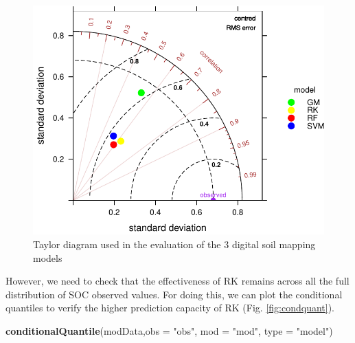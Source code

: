 \documentclass[10pt,b5paper,]{book}
\newenvironment{Shaded}{\begin{snugshade}}{\end{snugshade}}
\newcommand{\DataTypeTok}[1]{\textcolor[rgb]{0.13,0.29,0.53}{#1}}
\newcommand{\KeywordTok}[1]{\textcolor[rgb]{0.13,0.29,0.53}{\textbf{#1}}}
\newcommand{\NormalTok}[1]{#1}
\newcommand{\StringTok}[1]{\textcolor[rgb]{0.31,0.60,0.02}{#1}}
\theoremstyle{definition}
\theoremstyle{definition}
\theoremstyle{definition}
\theoremstyle{remark}
\begin{document}
\begin{figure}
\centering
\includegraphics{SOCMapping_files/figure-latex/taylor-1.pdf}
\caption{\label{fig:taylor}Taylor diagram used in the evaluation of the 3
digital soil mapping models}
\end{figure}

However, we need to check that the effectiveness of RK remains across
all the full distribution of SOC observed values. For doing this, we can
plot the conditional quantiles to verify the higher prediction capacity
of RK (Fig. \ref{fig:condquant}).

\begin{Shaded}
\begin{Highlighting}[]
\KeywordTok{conditionalQuantile}\NormalTok{(modData,}\DataTypeTok{obs =} \StringTok{"obs"}\NormalTok{, }\DataTypeTok{mod =} \StringTok{"mod"}\NormalTok{, }\DataTypeTok{type =} \StringTok{"model"}\NormalTok{)}
\end{Highlighting}
\end{Shaded}
\end{document}
